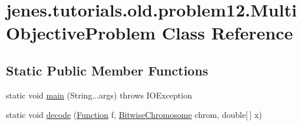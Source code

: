 \hypertarget{classjenes_1_1tutorials_1_1old_1_1problem12_1_1_multi_objective_problem}{\section{jenes.\-tutorials.\-old.\-problem12.\-Multi\-Objective\-Problem Class Reference}
\label{classjenes_1_1tutorials_1_1old_1_1problem12_1_1_multi_objective_problem}
}
\subsection*{Static Public Member Functions}
\begin{DoxyCompactItemize}
\item 
static void \hyperlink{classjenes_1_1tutorials_1_1old_1_1problem12_1_1_multi_objective_problem_aa56b8e189215e753714d1ed16fdf1075}{main} (String...\-args)  throws I\-O\-Exception 
\item 
static void \hyperlink{classjenes_1_1tutorials_1_1old_1_1problem12_1_1_multi_objective_problem_a793287d33c3ae22a258312881dbed2a3}{decode} (\hyperlink{classjenes_1_1tutorials_1_1old_1_1problem12_1_1_function}{Function} f, \hyperlink{classjenes_1_1chromosome_1_1_bitwise_chromosome}{Bitwise\-Chromosome} chrom, double\mbox{[}$\,$\mbox{]} x)
\end{DoxyCompactItemize}
